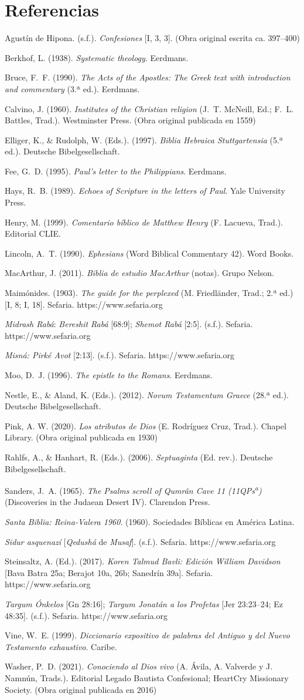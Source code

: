 \documentclass[11pt,letterpaper]{article}
\newcommand{\refapa}[1]{\par{\RaggedRight\hangindent=1.27cm\hangafter=1\noindent #1\par}\vspace{4pt}}
\begin{document}
\section*{Referencias}
\refapa{Agustín de Hipona. (s.f.). \emph{Confesiones} [I, 3, 3]. (Obra original escrita ca. 397--400)}
\refapa{Berkhof, L. (1938). \emph{Systematic theology}. Eerdmans.}
\refapa{Bruce, F.~F. (1990). \emph{The Acts of the Apostles: The Greek text with introduction and commentary} (3.ª ed.). Eerdmans.}
\refapa{Calvino, J. (1960). \emph{Institutes of the Christian religion} (J.~T. McNeill, Ed.; F.~L. Battles, Trad.). Westminster Press. (Obra original publicada en 1559)}
\refapa{Elliger, K., \& Rudolph, W. (Eds.). (1997). \emph{Biblia Hebraica Stuttgartensia} (5.ª ed.). Deutsche Bibelgesellschaft.}
\refapa{Fee, G.~D. (1995). \emph{Paul's letter to the Philippians}. Eerdmans.}
\refapa{Hays, R.~B. (1989). \emph{Echoes of Scripture in the letters of Paul}. Yale University Press.}
\refapa{Henry, M. (1999). \emph{Comentario bíblico de Matthew Henry} (F. Lacueva, Trad.). Editorial CLIE.}
\refapa{Lincoln, A.~T. (1990). \emph{Ephesians} (Word Biblical Commentary 42). Word Books.}
\refapa{MacArthur, J. (2011). \emph{Biblia de estudio MacArthur} (notas). Grupo Nelson.}
\refapa{Maimónides. (1903). \emph{The guide for the perplexed} (M. Friedländer, Trad.; 2.ª ed.) [I, 8; I, 18]. Sefaria. https://www.sefaria.org}
\refapa{\emph{Midrash Rabá}: \emph{Bereshit Rabá} [68:9]; \emph{Shemot Rabá} [2:5]. (s.f.). Sefaria. https://www.sefaria.org}
\refapa{\emph{Misná: Pirké Avot} [2:13]. (s.f.). Sefaria. https://www.sefaria.org}
\refapa{Moo, D.~J. (1996). \emph{The epistle to the Romans}. Eerdmans.}
\refapa{Nestle, E., \& Aland, K. (Eds.). (2012). \emph{Novum Testamentum Graece} (28.ª ed.). Deutsche Bibelgesellschaft.}
\refapa{Pink, A. W. (2020). \emph{Los atributos de Dios} (E. Rodríguez Cruz, Trad.). Chapel Library. (Obra original publicada en 1930)}
\refapa{Rahlfs, A., \& Hanhart, R. (Eds.). (2006). \emph{Septuaginta} (Ed. rev.). Deutsche Bibelgesellschaft.}
\refapa{Sanders, J.~A. (1965). \emph{The Psalms scroll of Qumrân Cave 11 (11QPs\textsuperscript{a})} (Discoveries in the Judaean Desert IV). Clarendon Press.}
\refapa{\emph{Santa Biblia: Reina-Valera 1960}. (1960). Sociedades Bíblicas en América Latina.}
\refapa{\emph{Sidur asquenazí} [\emph{Qedushá} de \emph{Musaf}]. (s.f.). Sefaria. https://www.sefaria.org}
\refapa{Steinsaltz, A. (Ed.). (2017). \emph{Koren Talmud Bavli: Edición William Davidson} [Bava Batra 25a; Berajot 10a, 26b; Sanedrín 39a]. Sefaria. https://www.sefaria.org}
\refapa{\emph{Targum Ónkelos} [Gn 28:16]; \emph{Targum Jonatán a los Profetas} [Jer 23:23--24; Ez 48:35]. (s.f.). Sefaria. https://www.sefaria.org}
\refapa{Vine, W.~E. (1999). \emph{Diccionario expositivo de palabras del Antiguo y del Nuevo Testamento exhaustivo}. Caribe.}
\refapa{Washer, P.~D. (2021). \emph{Conociendo al Dios vivo} (A. Ávila, A. Valverde y J. Namnún, Trads.). Editorial Legado Bautista Confesional; HeartCry Missionary Society. (Obra original publicada en 2016)}
\end{document}
